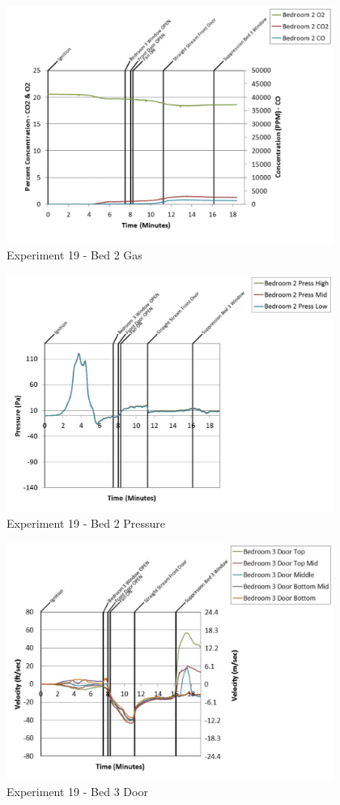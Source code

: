 \documentclass{article}
\begin{document}
\begin{appendices}
	\begin{figure}[h!]
		\centering
		\includegraphics[height=3.05in]{0_Images/Results_Charts/Exp_19_Charts/Bed2Gas.pdf}
		\caption{Experiment 19 - Bed 2 Gas}
	\end{figure}
 
	\clearpage

	\begin{figure}[h!]
		\centering
		\includegraphics[height=3.05in]{0_Images/Results_Charts/Exp_19_Charts/Bed2Pressure.pdf}
		\caption{Experiment 19 - Bed 2 Pressure}
	\end{figure}
 

	\begin{figure}[h!]
		\centering
		\includegraphics[height=3.05in]{0_Images/Results_Charts/Exp_19_Charts/Bed3Door.pdf}
		\caption{Experiment 19 - Bed 3 Door}
	\end{figure}
 

\end{appendices}
\end{document}

